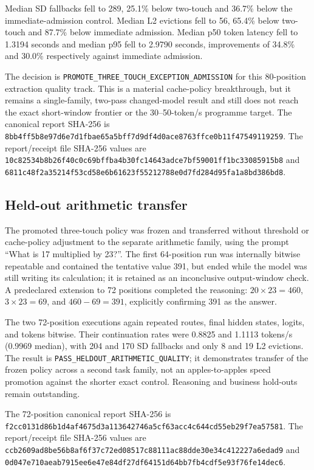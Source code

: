 Median SD fallbacks fell to 289, 25.1\% below two-touch and 36.7\% below the
immediate-admission control.  Median L2 evictions fell to 56, 65.4\% below
two-touch and 87.7\% below immediate admission.  Median p50 token latency fell
to 1.3194 seconds and median p95 fell to 2.9790 seconds, improvements of 34.8\%
and 30.0\% respectively against immediate admission.

The decision is \texttt{PROMOTE\_THREE\_TOUCH\_EXCEPTION\_ADMISSION} for this
80-position extraction quality track.  This is a material cache-policy
breakthrough, but it remains a single-family, two-pass changed-model result and
still does not reach the exact short-window frontier or the 30--50-token/s
programme target.  The canonical report SHA-256 is
\texttt{8bb4ff5b8e97d6e7d1fbae65a5bff7d9df4d0ace8763ffce0b11f47549119259}.
The report/receipt file SHA-256 values are
\texttt{10c82534b8b26f40c0c69bffba4b30fc14643adce7bf59001ff1bc33085915b8}
and
\texttt{6811c48f2a35214f53cd58e6b61623f55212788e0d7fd284d95fa1a8bd386bd8}.

\subsection{Held-out arithmetic transfer}

The promoted three-touch policy was frozen and transferred without threshold or
cache-policy adjustment to the separate arithmetic family, using the prompt
``What is 17 multiplied by 23?''.  The first 64-position run was internally
bitwise repeatable and contained the tentative value 391, but ended while the
model was still writing its calculation; it is retained as an inconclusive
output-window check.  A predeclared extension to 72 positions completed the
reasoning: $20\times23=460$, $3\times23=69$, and $460-69=391$, explicitly
confirming 391 as the answer.

The two 72-position executions again repeated routes, final hidden states,
logits, and tokens bitwise.  Their continuation rates were 0.8825 and 1.1113
tokens/s (0.9969 median), with 204 and 170 SD fallbacks and only 8 and 19 L2
evictions.  The result is \texttt{PASS\_HELDOUT\_ARITHMETIC\_QUALITY}; it
demonstrates transfer of the frozen policy across a second task family, not an
apples-to-apples speed promotion against the shorter exact control.  Reasoning
and business hold-outs remain outstanding.

The 72-position canonical report SHA-256 is
\texttt{f2cc0131d86b1d4af4675d3a113642746a5cf63acc4c644cd55eb29f7ea57581}.
The report/receipt file SHA-256 values are
\texttt{ccb2609ad8be56b8af6f37c72ed08517c88111ac88dde30e34c412227a6edad9}
and
\texttt{0d047e710aeab7915ee6e47e84df27df64151d64bb7fb4cdf5e93f76fe14dec6}.

